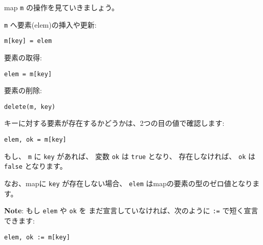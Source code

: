 map \texttt{m} の操作を見ていきましょう。

\texttt{m} へ要素(elem)の挿入や更新:

\begin{lstlisting}[numbers=none]
m[key] = elem
\end{lstlisting}

要素の取得:

\begin{lstlisting}[numbers=none]
elem = m[key]
\end{lstlisting}

要素の削除:

\begin{lstlisting}[numbers=none]
delete(m, key)
\end{lstlisting}

キーに対する要素が存在するかどうかは、2つの目の値で確認します:

\begin{lstlisting}[numbers=none]
elem, ok = m[key]
\end{lstlisting}

もし、 \texttt{m} に \texttt{key} があれば、
変数 \texttt{ok} は \texttt{true} となり、
存在しなければ、 \texttt{ok} は \texttt{false} となります。

なお、mapに \texttt{key} が存在しない場合、 
\texttt{elem} はmapの要素の型のゼロ値となります。

\textbf{Note}: もし \texttt{elem} や \texttt{ok} を
まだ宣言していなければ、次のように \texttt{:=} で短く宣言できます:

\begin{lstlisting}[numbers=none]
elem, ok := m[key]
\end{lstlisting}